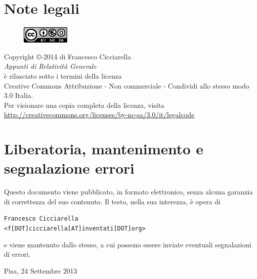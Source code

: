 \documentclass[12pt,a4paper]{report}
\theoremstyle{definition}
\begin{document}
\section*{Note legali}
\begin{center}
\begin{figure}[htbp]
\centering
\includegraphics[scale=1]{Addons/88x31.png}
\end{figure}
\vspace{0.5cm}
Copyright \copyright {}-2014 di Francesco Cicciarella \\
\textit{Appunti di Relatività Generale} \\	
è rilasciato sotto i termini della licenza \\
Creative Commons Attribuzione - Non commerciale - Condividi allo stesso modo 3.0 Italia. \\
Per visionare una copia completa della licenza, visita \\
\url{http://creativecommons.org/licenses/by-nc-sa/3.0/it/legalcode}
\end{center}
\section*{Liberatoria, mantenimento e segnalazione errori}
Questo documento viene pubblicato, in formato elettronico, senza alcuna garanzia di correttezza del suo contenuto. Il testo, nella sua interezza, è opera di \\

\vspace{0.3cm}
\begin{flushleft}
\texttt{Francesco Cicciarella}\\
\texttt{<f[DOT]cicciarella[AT]inventati[DOT]org>}
\end{flushleft}
\vspace{0.3cm}
e viene mantenuto dallo stesso, a cui possono essere inviate eventuali segnalazioni di errori.
\vspace{1cm}
\begin{flushright}
Pisa, 24 Settembre 2013
\end{flushright}
\pagebreak


\tableofcontents
\pagebreak
\end{document}
